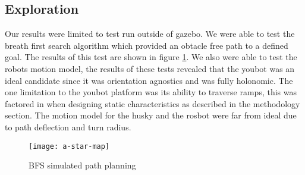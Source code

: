 \subsection{Exploration}
Our results were limited to test run outside of gazebo. We were able to test the breath first search algorithm which provided an obtacle free path to a defined goal. The results of this test are shown in figure \ref{fig:a-star-map}. We also were able to test the robots motion model, the results of these tests revealed that the youbot was an ideal candidate since it was orientation agnostics and was fully holonomic. The one limitation to the youbot platform was its ability to traverse ramps, this was factored in when designing static characteristics as described in the methodology section. The motion model for the husky and the rosbot were far from ideal due to path deflection and turn radius.

\begin{figure}[H]
  \centering
    \texttt{[image: a-star-map]}
  \caption{BFS simulated path planning} \label{fig:a-star-map}
\end{figure}
